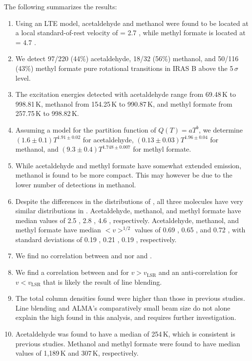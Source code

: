 \documentclass[iop,twocolappendix]{emulateapj}
\begin{document}
The following summarizes the results: 

\begin{enumerate}

\item Using an LTE model, acetaldehyde and methanol were found to be located at a local standard-of-rest velocity of {\vLSR} = 2.7 \kms, while methyl formate is located at {\vLSR} = 4.7 \kms.
\item We detect 97/220 (44\%) acetaldehyde, 18/32 (56\%) methanol, and 50/116 (43\%) methyl formate pure rotational transitions in IRAS B above the 5\,$\sigma$ level. 
\item The excitation energies detected with acetaldehyde range from 69.48\,K to 998.81\,K, methanol from 154.25\,K to 990.87\,K, and methyl formate from 257.75\,K to 998.82\,K.
\item Assuming a model for the partition function of $Q(T) = aT^b$, we determine $(1.6\pm0.1)T^{1.91\pm0.02}$ for acetaldehyde, $(0.13\pm0.03)T^{1.96\pm0.04}$ for methanol, and $(9.3\pm0.4)T^{1.748\pm0.007}$ for methyl formate. 
\item While acetaldehyde and methyl formate have somewhat extended emission, methanol is found to be more compact. This may however be due to the lower number of detections in methanol.
\item Despite the differences in the distributions of {\vLSR}, all three molecules have very similar distributions in {\dispersion}. Acetaldehyde, methanol, and methyl formate have median {\vLSR} values of 2.5 \kms, 2.8 {\kms}, 4.6 \kms, respectively. Acetaldehyde, methanol, and methyl formate have median $<v>^{1/2}$ values of 0.69 \kms, 0.65 \kms, and 0.72 \kms, with standard deviations of 0.19 \kms, 0.21 \kms, 0.19 \kms, respectively.
\item We find no correlation between {\Eul} and {\vLSR} nor {\Eul} and {\dispersion}.
\item We find a correlation between {\dispersion} and {\vLSR} for $v > v_\mathrm{LSR}$ and an anti-correlation for $v < v_\mathrm{LSR}$ that is likely the result of line blending. 
\item The total column densities {\Ntot} found were higher than those in previous studies. Line blending and ALMA's comparatively small beam size do not alone explain the high {\Ntot} found in this analysis, and requires further investigation. 
\item Acetaldehyde was found to have a median {\Trot} of 254\,K, which is consistent is previous studies. Methanol and methyl formate were found to have median {\Trot} values of 1,189\,K and 307\,K, respectively.

\end{enumerate}
\end{document}

